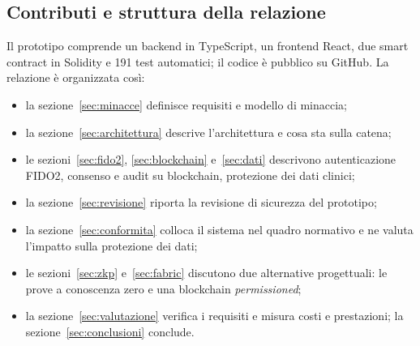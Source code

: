 \subsection{Contributi e struttura della relazione}
Il prototipo comprende un backend in TypeScript, un frontend React, due smart contract in Solidity e 191 test automatici; il codice è pubblico su GitHub. La relazione è organizzata così:
\begin{itemize}
  \item la sezione~\ref{sec:minacce} definisce requisiti e modello di minaccia;
  \item la sezione~\ref{sec:architettura} descrive l'architettura e cosa sta sulla catena;
  \item le sezioni~\ref{sec:fido2}, \ref{sec:blockchain} e~\ref{sec:dati} descrivono autenticazione FIDO2, consenso e audit su blockchain, protezione dei dati clinici;
  \item la sezione~\ref{sec:revisione} riporta la revisione di sicurezza del prototipo;
  \item la sezione~\ref{sec:conformita} colloca il sistema nel quadro normativo e ne valuta l'impatto sulla protezione dei dati;
  \item le sezioni~\ref{sec:zkp} e~\ref{sec:fabric} discutono due alternative progettuali: le prove a conoscenza zero e una blockchain \emph{permissioned};
  \item la sezione~\ref{sec:valutazione} verifica i requisiti e misura costi e prestazioni; la sezione~\ref{sec:conclusioni} conclude.
\end{itemize}
